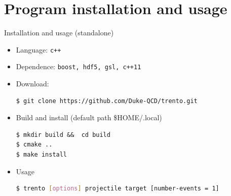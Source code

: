 \documentclass[11pt, aspectratio=169]{beamer}
\begin{document}
\section{Program installation and usage}
\begin{frame}[fragile]{Installation and usage (standalone)}
\begin{itemize}
\item Language: {\tt c++}
\item Dependence: {\tt boost, hdf5, gsl, c++11}
\item Download: 
\begin{lstlisting}
$ git clone https://github.com/Duke-QCD/trento.git
\end{lstlisting}
\item Build and install (default path \$HOME/.local)
\begin{lstlisting}
$ mkdir build &&  cd build
$ cmake ..
$ make install
\end{lstlisting}
\item Usage 
\begin{lstlisting}[language=bash]
$ trento [options] projectile target [number-events = 1]
\end{lstlisting}
\end{itemize}
\end{frame}
\end{document}
